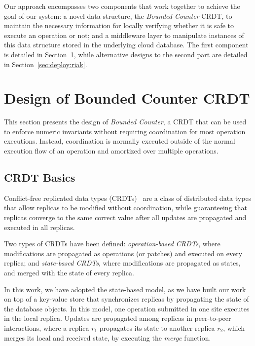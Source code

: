 \documentclass[conference]{IEEEtran}
\newcommand{\InvCounter}{\emph{Bounded Counter}}
\begin{document}
Our approach encompasses two components that work together to achieve the goal of our system: 
a novel data structure, the \InvCounter{} CRDT, to maintain the necessary information for 
locally verifying whether it is safe to execute an operation or not; and 
a middleware layer to manipulate instances of this data structure stored in
the underlying cloud database. 
The first component is detailed in Section~\ref{sec:crdt}, 
while alternative designs to the second part are detailed in Section~\ref{sec:deploy:riak}.
















\section{Design of Bounded Counter CRDT}\label{sec:crdt}

This section presents the design of \InvCounter{}, a CRDT that can be used to enforce numeric invariants without requiring coordination for most operation executions. Instead, coordination is normally executed outside of the normal execution flow of an operation and amortized over multiple operations.









\subsection{CRDT Basics}

Conflict-free replicated data types (CRDTs)~\cite{crdts} are a class of distributed data
types that allow replicas to be modified without coordination, while
guaranteeing that replicas converge to the same correct value after
all updates are propagated and executed in all replicas.  

Two types of CRDTs have been defined: \emph{operation-based CRDTs},
where modifications are propagated as operations (or patches) and executed on every
replica; and \emph{state-based CRDTs}, where modifications are
propagated as states, and merged with the state of every replica.

In this work, we have adopted the state-based model, as we have built our 
work on top of a key-value store that synchronizes replicas by propagating the 
state of the database objects. In this model,
one operation submitted in one site executes in the local replica.
Updates are propagated among replicas 
in peer-to-peer interactions, where a replica $r_1$ propagates its state 
to another replica $r_2$, which merges its local and received state, 
by executing the \emph{merge} function.
\end{document}
